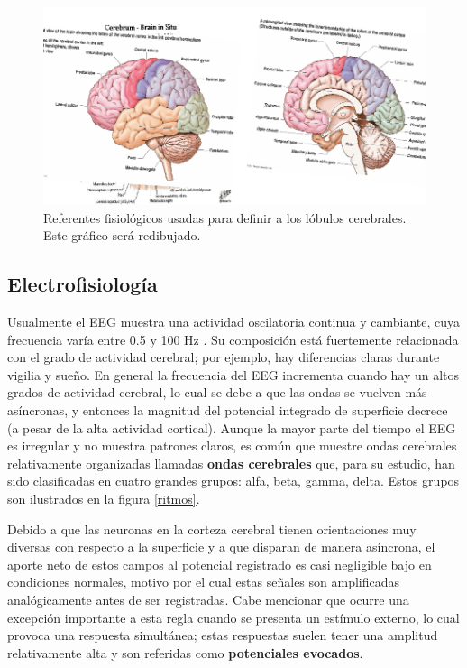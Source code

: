 \begin{figure}
\centering
\includegraphics[width=0.8\linewidth]{./img_diagramas/cerebro_zonas.pdf} 
\caption{Referentes fisiológicos usadas para definir a los lóbulos cerebrales. 
Este gráfico será redibujado.
}
\label{lobulos}
\end{figure}


\subsection{Electrofisiología}

Usualmente el EEG muestra una actividad oscilatoria continua y cambiante, cuya 
frecuencia var\'ia entre 0.5 y 100 Hz \cite{Clark98}.
Su composici\'on est\'a fuertemente relacionada con el grado de actividad 
cerebral; por ejemplo, hay diferencias claras durante vigilia y sue\~no.
En general la frecuencia del EEG incrementa cuando hay un altos grados de actividad cerebral, lo 
cual se debe a que las ondas se vuelven m\'as as\'incronas, y entonces la magnitud del  potencial 
integrado de superficie decrece (a pesar de la alta actividad cortical).
Aunque la mayor parte del tiempo el EEG es irregular y no muestra patrones claros, es com\'un que 
muestre ondas cerebrales relativamente organizadas llamadas \textbf{ondas cerebrales} que, 
para su estudio, han sido clasificadas en 
cuatro grandes grupos: alfa, beta, gamma, delta.
Estos grupos son ilustrados en la figura \ref{ritmos}.

Debido a que las neuronas en la corteza cerebral tienen orientaciones muy diversas con respecto a 
la superficie y a que disparan de manera asíncrona, el aporte neto de estos campos al potencial 
registrado es casi negligible bajo en condiciones normales, motivo por el cual estas señales son
amplificadas analógicamente antes de ser registradas.
%
Cabe mencionar que ocurre una excepción importante a esta regla cuando se presenta un estímulo
externo, lo cual provoca una respuesta simultánea; estas respuestas suelen tener una amplitud 
relativamente alta y son referidas como \textbf{potenciales evocados}.

